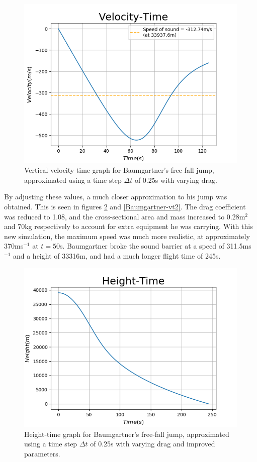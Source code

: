\documentclass[twocolumn,prl,nobalancelastpage,aps,10pt]{revtex4-1}
\begin{document}
\begin{figure}[H]
	\includegraphics*[width=0.96\linewidth,clip]{Baumgartner-vt}
	\caption{Vertical velocity-time graph for Baumgartner's free-fall jump, approximated using a time step $\Delta t$ of 0.25s with varying drag.}\label{Baumgartner-vt}
\end{figure}
By adjusting these values, a much closer approximation to his jump was obtained. This is seen in figures \ref{Baumgartner-ht2} and \ref{Baumgartner-vt2}. The drag coefficient was reduced to 1.08, and the cross-sectional area and mass increased to 0.28m$^{2}$ and 70kg respectively to account for extra equipment he was carrying. With this new simulation, the maximum speed was much more realistic, at approximately 370ms$^{-1}$ at $t=50$s. Baumgartner broke the sound barrier at a speed of 311.5ms$^{-1}$ and a height of 33316m, and had a much longer flight time of 245s.
\begin{figure}[H]
	\includegraphics*[width=0.96\linewidth,clip]{Baumgartner-ht2}
	\caption{Height-time graph for Baumgartner's free-fall jump, approximated using a time step $\Delta t$ of 0.25s with varying drag and improved parameters.}\label{Baumgartner-ht2}
\end{figure}
\end{document}
